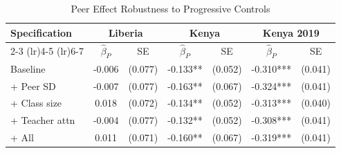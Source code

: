 \begin{table}[htbp]
\centering\small
\caption{Peer Effect Robustness to Progressive Controls}
\label{tab:peer_progressive}
\begin{tabular}{lcccccc}
\toprule
Specification & \multicolumn{2}{c}{Liberia} & \multicolumn{2}{c}{Kenya} & \multicolumn{2}{c}{Kenya 2019} \\
\cmidrule(lr){2-3} \cmidrule(lr){4-5} \cmidrule(lr){6-7}
 & $\hat{\beta}_P$ & SE & $\hat{\beta}_P$ & SE & $\hat{\beta}_P$ & SE \\
\midrule
Baseline & -0.006 & (0.077) & -0.133** & (0.052) & -0.310*** & (0.041) \\
+ Peer SD & -0.007 & (0.077) & -0.163** & (0.067) & -0.324*** & (0.041) \\
+ Class size & 0.018 & (0.072) & -0.134** & (0.052) & -0.313*** & (0.040) \\
+ Teacher attn & -0.004 & (0.077) & -0.132** & (0.052) & -0.308*** & (0.041) \\
+ All & 0.011 & (0.071) & -0.160** & (0.067) & -0.319*** & (0.041) \\
\bottomrule
\end{tabular}
\par\smallskip{}
\end{table}
